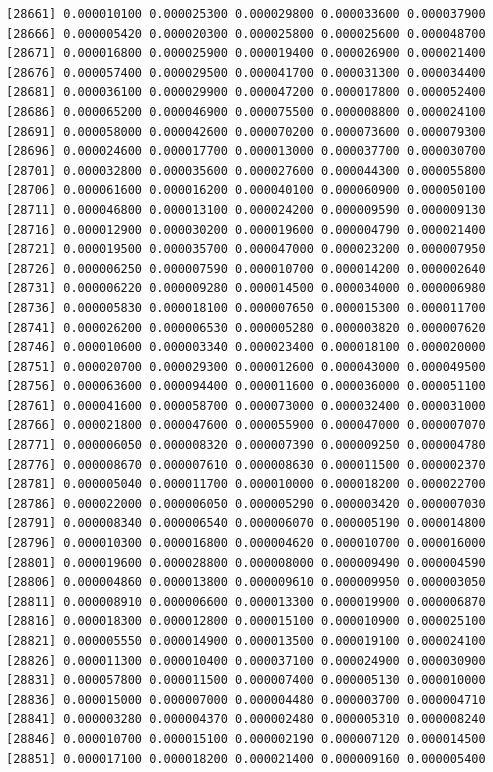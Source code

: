 \documentclass[]{article}
\begin{document}
\begin{verbatim}
[28661] 0.000010100 0.000025300 0.000029800 0.000033600 0.000037900
[28666] 0.000005420 0.000020300 0.000025800 0.000025600 0.000048700
[28671] 0.000016800 0.000025900 0.000019400 0.000026900 0.000021400
[28676] 0.000057400 0.000029500 0.000041700 0.000031300 0.000034400
[28681] 0.000036100 0.000029900 0.000047200 0.000017800 0.000052400
[28686] 0.000065200 0.000046900 0.000075500 0.000008800 0.000024100
[28691] 0.000058000 0.000042600 0.000070200 0.000073600 0.000079300
[28696] 0.000024600 0.000017700 0.000013000 0.000037700 0.000030700
[28701] 0.000032800 0.000035600 0.000027600 0.000044300 0.000055800
[28706] 0.000061600 0.000016200 0.000040100 0.000060900 0.000050100
[28711] 0.000046800 0.000013100 0.000024200 0.000009590 0.000009130
[28716] 0.000012900 0.000030200 0.000019600 0.000004790 0.000021400
[28721] 0.000019500 0.000035700 0.000047000 0.000023200 0.000007950
[28726] 0.000006250 0.000007590 0.000010700 0.000014200 0.000002640
[28731] 0.000006220 0.000009280 0.000014500 0.000034000 0.000006980
[28736] 0.000005830 0.000018100 0.000007650 0.000015300 0.000011700
[28741] 0.000026200 0.000006530 0.000005280 0.000003820 0.000007620
[28746] 0.000010600 0.000003340 0.000023400 0.000018100 0.000020000
[28751] 0.000020700 0.000029300 0.000012600 0.000043000 0.000049500
[28756] 0.000063600 0.000094400 0.000011600 0.000036000 0.000051100
[28761] 0.000041600 0.000058700 0.000073000 0.000032400 0.000031000
[28766] 0.000021800 0.000047600 0.000055900 0.000047000 0.000007070
[28771] 0.000006050 0.000008320 0.000007390 0.000009250 0.000004780
[28776] 0.000008670 0.000007610 0.000008630 0.000011500 0.000002370
[28781] 0.000005040 0.000011700 0.000010000 0.000018200 0.000022700
[28786] 0.000022000 0.000006050 0.000005290 0.000003420 0.000007030
[28791] 0.000008340 0.000006540 0.000006070 0.000005190 0.000014800
[28796] 0.000010300 0.000016800 0.000004620 0.000010700 0.000016000
[28801] 0.000019600 0.000028800 0.000008000 0.000009490 0.000004590
[28806] 0.000004860 0.000013800 0.000009610 0.000009950 0.000003050
[28811] 0.000008910 0.000006600 0.000013300 0.000019900 0.000006870
[28816] 0.000018300 0.000012800 0.000015100 0.000010900 0.000025100
[28821] 0.000005550 0.000014900 0.000013500 0.000019100 0.000024100
[28826] 0.000011300 0.000010400 0.000037100 0.000024900 0.000030900
[28831] 0.000057800 0.000011500 0.000007400 0.000005130 0.000010000
[28836] 0.000015000 0.000007000 0.000004480 0.000003700 0.000004710
[28841] 0.000003280 0.000004370 0.000002480 0.000005310 0.000008240
[28846] 0.000010700 0.000015100 0.000002190 0.000007120 0.000014500
[28851] 0.000017100 0.000018200 0.000021400 0.000009160 0.000005400

\end{verbatim}
\end{document}
